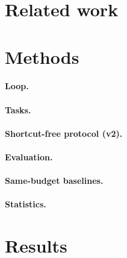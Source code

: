 \documentclass[11pt]{article}
\begin{document}
\section{Related work}\label{sec:related}

\section{Methods}\label{sec:methods}

\paragraph{Loop.}

\paragraph{Tasks.}

\paragraph{Shortcut-free protocol (v2).}

\paragraph{Evaluation.}

\paragraph{Same-budget baselines.}

\paragraph{Statistics.}

\section{Results}\label{sec:results}
\end{document}
